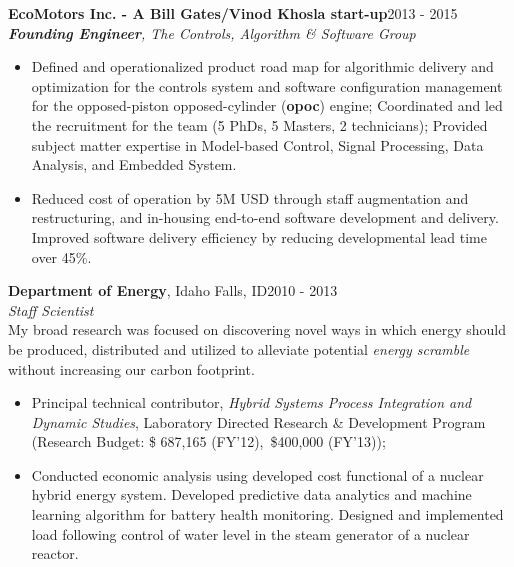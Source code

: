 \documentclass[letterpaper,11pt]{article}
\begin{document}
      \textbf{EcoMotors Inc. - A Bill Gates/Vinod Khosla start-up}\hfill {2013 - 2015}
      \\
       \emph{\textbf{Founding Engineer}, The Controls, Algorithm \& Software Group}\\
\begin{itemize}[leftmargin=.2in]
 \setlength{\itemsep}{0pt}
 \setlength\itemsep{1mm}
\item Defined and operationalized product road map for algorithmic delivery and optimization for {the controls system and software configuration management for the opposed-piston opposed-cylinder (\textbf{opoc}) engine}; Coordinated and led the recruitment for the team (5 PhDs, 5 Masters, 2 technicians); Provided subject matter expertise in Model-based Control, Signal Processing, Data Analysis, and Embedded System. 
\item Reduced cost of operation by 5M USD through staff augmentation and restructuring, and in-housing end-to-end software development and delivery. Improved software delivery efficiency by reducing developmental lead time over 45\%.
\end{itemize}

 
      \textbf{Department of Energy}, Idaho Falls, ID\hfill {2010 - 2013}
      \\
       \emph{Staff Scientist}\\[2mm]
 My broad research was focused on
discovering novel ways in which energy should be produced, distributed
and utilized to alleviate potential {\em energy scramble} without
increasing our carbon footprint.\\
\begin{itemize}[leftmargin=.2in]
 \setlength{\itemsep}{0pt}
 \setlength\itemsep{1mm}
  \vspace*{-1mm}
 \item Principal technical contributor, \textit{Hybrid Systems Process
 Integration and Dynamic Studies}, Laboratory Directed
 Research \& Development Program (Research Budget: \$ 687,165
 (FY'12),~\$400,000 (FY'13));
 \item Conducted economic analysis using developed cost functional of
a nuclear hybrid energy system. Developed predictive data analytics and machine learning algorithm for battery health monitoring. Designed and implemented load following control of water level in the steam generator of
a nuclear reactor.
\end{itemize}
 
\end{document}
